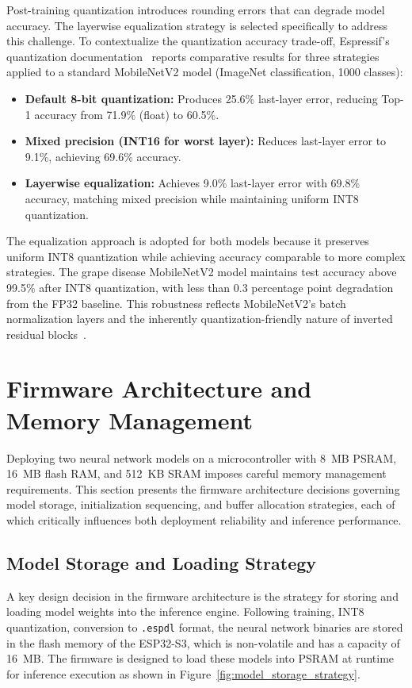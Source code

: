 Post-training quantization introduces rounding errors that can degrade model accuracy. The layerwise equalization strategy is selected specifically to address this challenge. To contextualize the quantization accuracy trade-off, Espressif's quantization documentation~\cite{esp_dl_mobilenetv2_tutorial} reports comparative results for three strategies applied to a standard MobileNetV2 model (ImageNet classification, 1000 classes):

\begin{itemize}
    \item \textbf{Default 8-bit quantization:} Produces 25.6\% last-layer error, reducing Top-1 accuracy from 71.9\% (float) to 60.5\%.
    \item \textbf{Mixed precision (INT16 for worst layer):} Reduces last-layer error to 9.1\%, achieving 69.6\% accuracy.
    \item \textbf{Layerwise equalization:} Achieves 9.0\% last-layer error with 69.8\% accuracy, matching mixed precision while maintaining uniform INT8 quantization.
\end{itemize}

The equalization approach is adopted for both models because it preserves uniform INT8 quantization while achieving accuracy comparable to more complex strategies. The grape disease MobileNetV2 model maintains test accuracy above 99.5\% after INT8 quantization, with less than 0.3 percentage point degradation from the FP32 baseline. This robustness reflects MobileNetV2's batch normalization layers and the inherently quantization-friendly nature of inverted residual blocks~\cite{jacob2018quantization}.


\section{Firmware Architecture and Memory Management}
\label{sec:firmware_memory}

Deploying two neural network models on a microcontroller with 8~MB PSRAM, 16~MB flash RAM, and 512~KB SRAM imposes careful memory management requirements. This section presents the firmware architecture decisions governing model storage, initialization sequencing, and buffer allocation strategies, each of which critically influences both deployment reliability and inference performance.
\subsection{ Model Storage and Loading Strategy}
A key design decision in the firmware architecture is the strategy for storing and loading model weights into the inference engine. Following training, INT8 quantization, conversion to \texttt{.espdl} format, the neural network binaries are stored in the flash memory of the ESP32-S3, which is non-volatile and has a capacity of 16~MB. The firmware is designed to load these models into PSRAM at runtime for inference execution as shown in Figure~\ref{fig:model_storage_strategy}.


